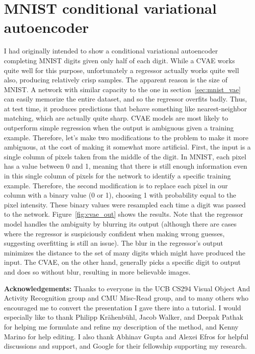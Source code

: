 \documentclass[a4paper, 11pt]{article} %
\begin{document}
\section{MNIST conditional variational autoencoder}
I had originally intended to show a conditional variational autoencoder completing MNIST digits given only half of each digit. 
While a CVAE works quite well for this purpose, unfortunately a regressor actually works quite well also, producing relatively crisp samples.
The apparent reason is the size of MNIST.
A network with similar capacity to the one in section~\ref{sec:mnist_vae} can easily memorize the entire dataset, and so the regressor overfits badly.
Thus, at test time, it produces predictions that behave something like nearest-neighbor matching, which are actually quite sharp.
CVAE models are most likely to outperform simple regression when the output is ambiguous given a training example.
Therefore, let's make two modifications to the problem to make it more ambiguous, at the cost of making it somewhat more artificial.
First, the input is a single column of pixels taken from the middle of the digit.
In MNIST, each pixel has a value between 0 and 1, meaning that there is still enough information even in this single column of pixels for the network to identify a specific training example.
Therefore, the second modification is to replace each pixel in our column with a binary value (0 or 1), choosing 1 with probability equal to the pixel intensity.
These binary values were resampled each time a digit was passed to the network.
Figure~\ref{fig:cvae_out} shows the results.  
Note that the regressor model handles the ambiguity by blurring its output (although there are cases where the regressor is suspiciously confident when making wrong guesses, suggesting overfitting is still an issue). 
The blur in the regressor's output minimizes the distance to the set of many digits which might have produced the input. 
The CVAE, on the other hand, generally picks a specific digit to output and does so without blur, resulting in more believable images. 


\textbf{Acknowledgements:} 
Thanks to everyone in the UCB CS294 Visual Object And Activity Recognition group and CMU Misc-Read group, and to many others who encouraged me to convert the presentation I gave there into a tutorial.
I would especially like to thank Philipp Kr{\"a}henb{\"u}hl, Jacob Walker, and Deepak Pathak for helping me formulate and refine my description of the method, and Kenny Marino for help editing.
I also thank Abhinav Gupta and Alexei Efros for helpful discussions and support, and Google for their fellowship supporting my research.
\end{document}
